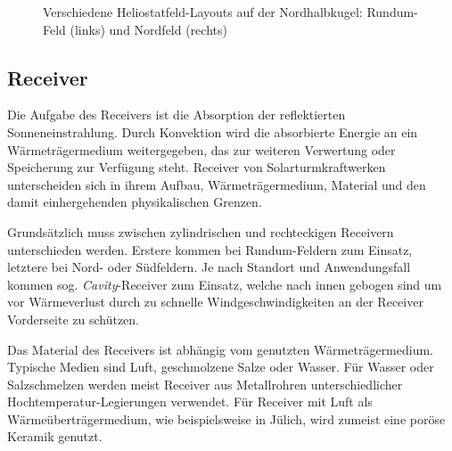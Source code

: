 \begin{figure}[h!]
    \centering
    \setlength{\fboxsep}{1pt}
    \setlength{\fboxrule}{1pt}
\caption[Verschiedene Heliostatfeld-Layouts auf der Nordhalbkugel: Rundum-Feld und Nordfeld]{Verschiedene Heliostatfeld-Layouts auf der Nordhalbkugel: Rundum-Feld (links) und Nordfeld (rechts) \cite[S.14]{DissBelhomme}}
    \label{fig_AnordnungHeliostatfeld}
\end{figure}

\subsection{Receiver} \label{subsec_Receiver}

Die Aufgabe des Receivers ist die Absorption der reflektierten Sonneneinstrahlung.
Durch Konvektion wird die absorbierte Energie an ein Wärmeträgermedium weitergegeben, das zur weiteren Verwertung oder Speicherung zur Verfügung steht.
Receiver von Solarturmkraftwerken unterscheiden sich in ihrem Aufbau, Wärmeträgermedium, Material und den damit einhergehenden physikalischen Grenzen.

Grundsätzlich muss zwischen zylindrischen und rechteckigen Receivern unterschieden werden.
Erstere kommen bei Rundum-Feldern zum Einsatz, letztere bei Nord- oder Südfeldern.
Je nach Standort und Anwendungsfall kommen sog. \textit{Cavity}-Receiver zum Einsatz, welche nach innen gebogen sind um vor Wärmeverlust durch zu schnelle Windgeschwindigkeiten an der Receiver Vorderseite zu schützen. \cite{Flesch}

Das Material des Receivers ist abhängig vom genutzten Wärmeträgermedium.
Typische Medien sind Luft, geschmolzene Salze oder Wasser.
Für Wasser oder Salzschmelzen werden meist Receiver aus Metallrohren unterschiedlicher Hochtemperatur-Legierungen verwendet.
Für Receiver mit Luft als Wärmeüberträgermedium, wie beispielsweise in Jülich, wird zumeist eine poröse Keramik genutzt. \cite{Barlev}\cite{Ho2017}


